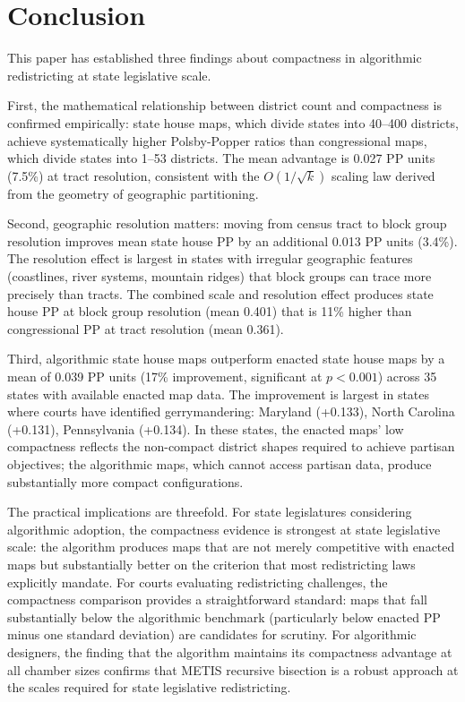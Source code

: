 \section{Conclusion}
\label{sec:conclusion}

This paper has established three findings about compactness in algorithmic redistricting at state legislative scale.

First, the mathematical relationship between district count and compactness is confirmed empirically: state house maps, which divide states into 40--400 districts, achieve systematically higher Polsby-Popper ratios than congressional maps, which divide states into 1--53 districts. The mean advantage is 0.027 PP units (7.5\%) at tract resolution, consistent with the $O(1/\sqrt{k})$ scaling law derived from the geometry of geographic partitioning.

Second, geographic resolution matters: moving from census tract to block group resolution improves mean state house PP by an additional 0.013 PP units (3.4\%). The resolution effect is largest in states with irregular geographic features (coastlines, river systems, mountain ridges) that block groups can trace more precisely than tracts. The combined scale and resolution effect produces state house PP at block group resolution (mean 0.401) that is 11\% higher than congressional PP at tract resolution (mean 0.361).

Third, algorithmic state house maps outperform enacted state house maps by a mean of 0.039 PP units (17\% improvement, significant at $p < 0.001$) across 35 states with available enacted map data. The improvement is largest in states where courts have identified gerrymandering: Maryland (+0.133), North Carolina (+0.131), Pennsylvania (+0.134). In these states, the enacted maps' low compactness reflects the non-compact district shapes required to achieve partisan objectives; the algorithmic maps, which cannot access partisan data, produce substantially more compact configurations.

The practical implications are threefold. For state legislatures considering algorithmic adoption, the compactness evidence is strongest at state legislative scale: the algorithm produces maps that are not merely competitive with enacted maps but substantially better on the criterion that most redistricting laws explicitly mandate. For courts evaluating redistricting challenges, the compactness comparison provides a straightforward standard: maps that fall substantially below the algorithmic benchmark (particularly below enacted PP minus one standard deviation) are candidates for scrutiny. For algorithmic designers, the finding that the algorithm maintains its compactness advantage at all chamber sizes confirms that METIS recursive bisection is a robust approach at the scales required for state legislative redistricting.

